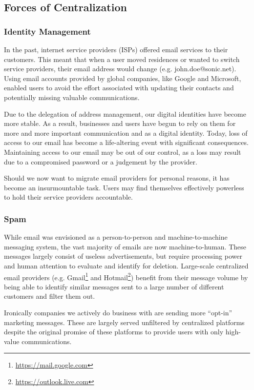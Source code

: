 \documentclass{article}
\begin{document}
\subsection{Forces of Centralization}

\subsubsection{Identity Management}

In the past, internet service providers (ISPs) offered email services to their customers. This meant that when a user moved residences or wanted to switch service providers, their email address would change (e.g. john.doe@sonic.net). Using email accounts provided by global companies, like Google and Microsoft, enabled users to avoid the effort associated with updating their contacts and potentially missing valuable communications.


Due to the delegation of address management, our digital identities have become more stable. As a result, businesses and users have begun to rely on them for more and more important communication and as a digital identity. Today, loss of access to our email has become a life-altering event with significant consequences. Maintaining access to our email may be out of our control, as a loss may result due to a compromised password or a judgement by the provider. 

Should we now want to migrate email providers for personal reasons, it has become an insurmountable task. Users may find themselves effectively powerless to hold their service providers accountable.

\subsubsection{Spam}

While email was envisioned as a person-to-person and machine-to-machine messaging system, the vast majority of emails are now machine-to-human. These messages largely consist of useless advertisements, but require processing power and human attention to evaluate and identify for deletion. Large-scale centralized email providers (e.g. Gmail\footnote{\url{https://mail.google.com}} and Hotmail\footnote{\url{https://outlook.live.com}}) benefit from their message volume by being able to identify similar messages sent to a large number of different customers and filter them out.

Ironically companies we actively do business with are sending more ``opt-in'' marketing messages. These are largely served unfiltered by centralized platforms despite the original promise of these platforms to provide users with only high-value communications.
\end{document}
